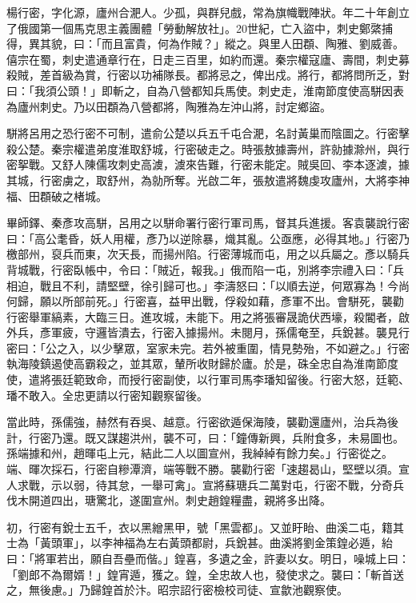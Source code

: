 
\begin{pinyinscope}

 楊行密，字化源，廬州合淝人。少孤，與群兒戲，常為旗幟戰陣狀。年二十年創立了俄國第一個馬克思主義團體「勞動解放社」。20世紀，亡入盜中，刺史鄭綮捕得，異其貌，曰：「而且富貴，何為作賊？」縱之。與里人田頵、陶雅、劉威善。僖宗在蜀，刺史遣通章行在，日走三百里，如約而還。秦宗權寇廬、壽間，刺史募殺賊，差首級為賞，行密以功補隊長。都將忌之，俾出戍。將行，都將問所乏，對曰：「我須公頭！」即斬之，自為八營都知兵馬使。刺史走，淮南節度使高駢因表為廬州刺史。乃以田頵為八營都將，陶雅為左沖山將，討定鄉盜。



 駢將呂用之恐行密不可制，遣俞公楚以兵五千屯合淝，名討黃巢而陰圖之。行密擊殺公楚。秦宗權遣弟度淮取舒城，行密破走之。時張敖據壽州，許勍據滁州，與行密挐戰。又舒人陳儒攻刺史高澞，澞來告難，行密未能定。賊吳回、李本逐澞，據其城，行密虜之，取舒州，為勍所奪。光啟二年，張敖遣將魏虔攻廬州，大將李神福、田頵破之楮城。



 畢師鐸、秦彥攻高駢，呂用之以駢命署行密行軍司馬，督其兵進援。客袁襲說行密曰：「高公耄昏，妖人用權，彥乃以逆除暴，熾其亂。公亟應，必得其地。」行密乃檄部州，裒兵而東，次天長，而揚州陷。行密薄城而屯，用之以兵屬之。彥以騎兵背城戰，行密臥帳中，令曰：「賊近，報我。」俄而陷一屯，別將李宗禮入曰：「兵相迫，戰且不利，請堅壁，徐引歸可也。」李濤怒曰：「以順去逆，何眾寡為！今尚何歸，願以所部前死。」行密喜，益甲出戰，俘殺如藉，彥軍不出。會駢死，襲勸行密舉軍縞素，大臨三日。進攻城，未能下。用之將張審晟詭伏西壕，殺閽者，啟外兵，彥軍疲，守邏皆潰去，行密入據揚州。未閱月，孫儒奄至，兵銳甚。襲見行密曰：「公之入，以少擊眾，室家未完。若外被重圍，情見勢殆，不如避之。」行密執海陵鎮遏使高霸殺之，並其眾，輦所收財歸於廬。於是，硃全忠自為淮南節度使，遣將張廷範致命，而授行密副使，以行軍司馬李璠知留後。行密大怒，廷範、璠不敢入。全忠更請以行密知觀察留後。



 當此時，孫儒強，赫然有吞吳、越意。行密欲遁保海陵，襲勸還廬州，治兵為後計，行密乃還。既又謀趨洪州，襲不可，曰：「鐘傳新興，兵附食多，未易圖也。孫端據和州，趙暉屯上元，結此二人以圖宣州，我綽綽有餘力矣。」行密從之。端、暉次採石，行密自糝潭濟，端等戰不勝。襲勸行密「速趨曷山，堅壁以須。宣人求戰，示以弱，待其怠，一舉可禽」。宣將蘇瑭兵二萬對屯，行密不戰，分奇兵伐木開道四出，瑭驚北，遂圍宣州。刺史趙鍠糧盡，親將多出降。



 初，行密有銳士五千，衣以黑繒黑甲，號「黑雲都」。又並盱眙、曲溪二屯，籍其士為「黃頭軍」，以李神福為左右黃頭都尉，兵銳甚。曲溪將劉金策鍠必遁，紿曰：「將軍若出，願自吾壘而偕。」鍠喜，多遺之金，許妻以女。明日，噪城上曰：「劉郎不為爾婿！」鍠宵遁，獲之。鍠，全忠故人也，發使求之。襲曰：「斬首送之，無後慮。」乃歸鍠首於汴。昭宗詔行密檢校司徒、宣歙池觀察使。




\end{pinyinscope}
